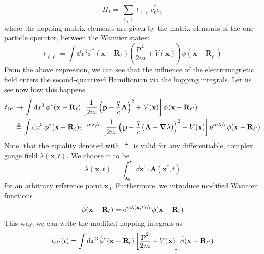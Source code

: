 \begin{equation}
    H_{1} = \sum_{\ell,\ell^{\prime} } t_{\ell\ell^{\prime}} c^{\dag}_{\ell}c_{\ell^{\prime}}
\end{equation}
where the hopping matrix elements are given by the matrix elements of the one-particle operator,
between the Wannier states:
\begin{equation}
    t_{\ell\ell^{\prime}} = \int \dd{x^3} \phi^{*}(\mathbf{x} - \mathbf{R}_{\ell})
    \left(\frac{\mathbf{p}^{2}}{2m} + V(\mathbf{x} )\right)\phi(\mathbf{x} - \mathbf{R}_{\ell^{\prime}})
\end{equation}
From the above expression, we can see that the influence of the electromagnetic field enters the second-quantized
Hamiltonian via the hopping integrals. Let us see now how this happens
\begin{align}
    t_{\ell\ell^{\prime}} & \to \int \dd{x^3} \phi^{*}(\mathbf{x} - \mathbf{R}_{\ell})
    \left[\frac{1}{2m}\left( \mathbf{p} - \frac{q}{c} \mathbf{A}  \right)^2  + V(\mathbf{x} )\right]
    \phi(\mathbf{x} - \mathbf{R}_{\ell^{\prime}}) \nonumber                                                                 \\
                          & \triangleq \int \dd{x^3} \phi^{*}(\mathbf{x} - \mathbf{R}_{\ell}) \mathrm{e}^{-i e \lambda / c}
    \left[\frac{1}{2m}\left( \mathbf{p} - \frac{q}{c} \left( \mathbf{A} - \grad{\lambda } \right)   \right)^2  + V(\mathbf{x} )\right]
    \mathrm{e}^{i e \lambda / c} \phi(\mathbf{x} - \mathbf{R}_{\ell^{\prime}})
\end{align}
Note, that the equality denoted with \(\triangleq \) is valid for any differentiable, complex gauge field \(\lambda (\mathbf{x},t)\).
We choose it to be
\begin{equation}
    \lambda (\mathbf{x},t) =  \int_{\mathbf{x}_0 }^{\mathbf{x}} \dd{\mathbf{x}^{\prime}} \cdot \mathbf{A}(\mathbf{x}^{\prime},t)
\end{equation}
for an arbitrary reference point \(\mathbf{x}_0 \). Furthermore, we introduce modified Wannier functions
\begin{equation}
    \Tilde{\phi}(\mathbf{x} - \mathbf{R}_{\ell}) = \mathrm{e}^{i e \lambda(\mathbf{x} ,t) / c} \phi(\mathbf{x} - \mathbf{R}_{\ell})
\end{equation}
This way, we can write the modified hopping integrals as
\begin{equation}
    {t}_{\ell\ell^{\prime}}(t) = \int \dd{x^3} \Tilde{\phi}^{*}(\mathbf{x} - \mathbf{R}_{\ell})
    \left[\frac{\mathbf{p}^2}{2m}  + V(\mathbf{x} )\right]
    \Tilde{\phi}(\mathbf{x} - \mathbf{R}_{\ell^{\prime}})
\end{equation}
